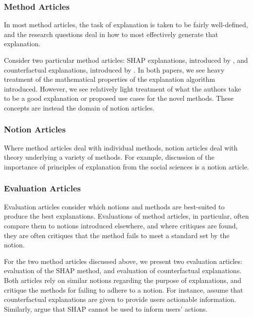\subsubsection{Method Articles}
In most method articles, the task of explanation is taken to be fairly well-defined, and the research questions deal in how to most effectively generate that explanation. 

Consider two particular method articles: SHAP explanations, introduced by \textcite{lundberg_unified_2017}, and counterfactual explanations, introduced by \textcite{wachter_counterfactual_2017}. In both papers, we see heavy treatment of the mathematical properties of the explanation algorithm introduced. However, we see relatively light treatment of what the authors take to be a good explanation or proposed use cases for the novel methods. These concepts are instead the domain of notion articles.

\subsubsection{Notion Articles}
Where method articles deal with individual methods, notion articles deal with theory underlying a variety of methods. For example, \textcite{miller_explanation_2017} discussion of the importance of principles of explanation from the social sciences is a notion article.

\subsubsection{Evaluation Articles}
Evaluation articles consider which notions and methods are best-suited to produce the best explanations. Evaluations of method articles, in particular, often compare them to notions introduced elsewhere, and where critiques are found, they are often critiques that the method fails to meet a standard set by the notion.

For the two method articles discussed above, we present two evaluation articles: \textcite{kumar_problems_2020} evaluation of the SHAP method, and \textcite{barocas_hidden_2020} evaluation of counterfactual explanations. Both articles rely on similar notions regarding the purpose of explanations, and critique the methods for failing to adhere to a notion. For instance, \textcite{barocas_hidden_2020} assume that counterfactual explanations are given to provide users actionable information. Similarly, \textcite{kumar_problems_2020} argue that SHAP cannot be used to inform users' actions.

